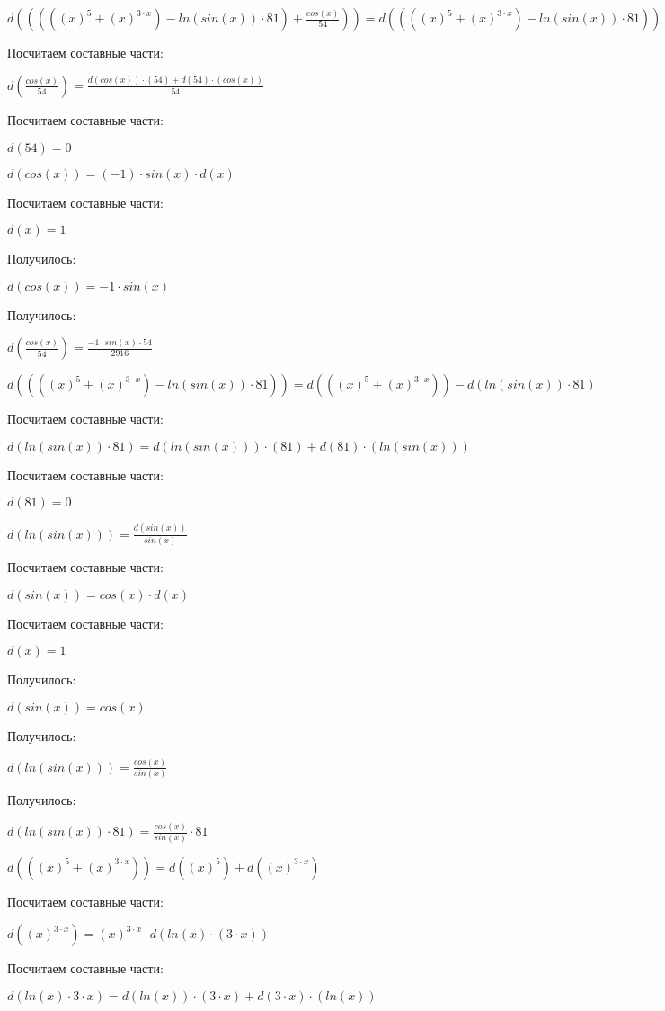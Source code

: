 $ d(((((x)^{5}+(x)^{3 \cdot x})-ln(sin(x)) \cdot 81)+\frac{cos(x)}{54})) = d((((x)^{5}+(x)^{3 \cdot x})-ln(sin(x)) \cdot 81)) + d(\frac{cos(x)}{54})$

Посчитаем составные части:

$ d(\frac{cos(x)}{54}) = \frac{d(cos(x)) \cdot (54) + d(54) \cdot (cos(x))}{54}$

Посчитаем составные части:

$ d(54) = 0$

$ d(cos(x)) = (-1) \cdot sin(x) \cdot d(x)$

Посчитаем составные части:

$ d(x) = 1$

Получилось:

$ d(cos(x)) = -1 \cdot sin(x)$

Получилось:

$ d(\frac{cos(x)}{54}) = \frac{-1 \cdot sin(x) \cdot 54}{2916}$

$ d((((x)^{5}+(x)^{3 \cdot x})-ln(sin(x)) \cdot 81)) = d(((x)^{5}+(x)^{3 \cdot x})) - d(ln(sin(x)) \cdot 81)$

Посчитаем составные части:

$ d(ln(sin(x)) \cdot 81) = d(ln(sin(x))) \cdot (81) + d(81) \cdot (ln(sin(x)))$

Посчитаем составные части:

$ d(81) = 0$

$ d(ln(sin(x))) = \frac{d(sin(x))}{sin(x)}$

Посчитаем составные части:

$ d(sin(x)) = cos(x) \cdot d(x)$

Посчитаем составные части:

$ d(x) = 1$

Получилось:

$ d(sin(x)) = cos(x)$

Получилось:

$ d(ln(sin(x))) = \frac{cos(x)}{sin(x)}$

Получилось:

$ d(ln(sin(x)) \cdot 81) = \frac{cos(x)}{sin(x)} \cdot 81$

$ d(((x)^{5}+(x)^{3 \cdot x})) = d((x)^{5}) + d((x)^{3 \cdot x})$

Посчитаем составные части:

$ d((x)^{3 \cdot x}) = (x)^{3 \cdot x} \cdot d(ln(x) \cdot (3 \cdot x))$

Посчитаем составные части:

$ d(ln(x) \cdot 3 \cdot x) = d(ln(x)) \cdot (3 \cdot x) + d(3 \cdot x) \cdot (ln(x))$

